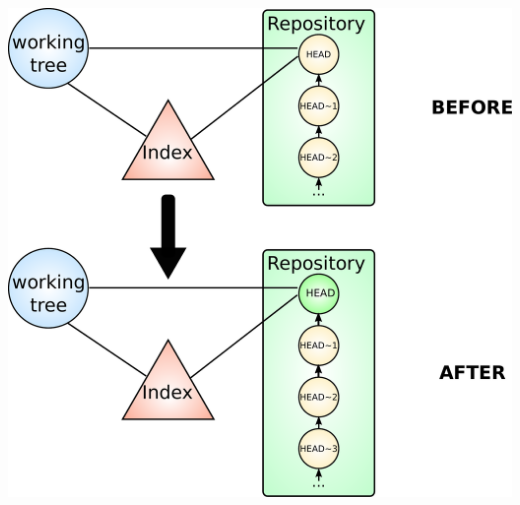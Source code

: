 \begin{frame}
  \frametitle{\insertsubsection}
  \begin{center}
    \includegraphics[height=0.8\textheight]{images/pdf/git-detailed-9.pdf}
  \end{center}
\end{frame}


